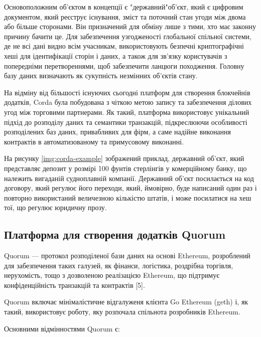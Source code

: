 \documentclass{lib/styles/default-style}
\begin{document}
    Основоположним об'єктом в концепції є "державний"\enspace об'єкт, який є цифровим документом,
    який реєструє існування, зміст та поточний стан угоди між двома або більше сторонами.
    Він призначений для обміну лише з тими, хто має законну причину бачити це.
    Для забезпечення узгодженості глобальної спільної системи, де не всі дані видно всім учасникам,
    використовують безпечні криптографічні хеші для ідентифікації сторін і даних, а також для зв’язку користувачів
    з попередніми перетвореннями,
    щоб забезпечити ланцюги походження. Головну базу даних визначають як сукупність незмінних об'єктів стану.

    На відміну від більшості існуючих сьогодні платформ для створення блокчейнів додатків, Corda була побудована з чіткою метою
    запису та забезпечення ділових угод між торговими партнерами.
    Як такий, платформа використовує унікальний підхід до розподілу даних та семантики транзакцій,
    підкреслюючи особливості розподілених баз даних, привабливих для фірм, а саме надійне виконання контрактів в автоматизованому
    та примусовому виконанні.

    На рисунку \ref{img:corda-example} зображений приклад, державний об'єкт,
    який представляє депозит у розмірі 100 фунтів стерлінгів у комерційному банку,
    що належить вигаданій судноплавній компанії.
    Державний об'єкт посилається на код договору,
    який регулює його переходи, який, ймовірно,
    буде написаний один раз і повторно використаний величезною кількістю штатів, і може посилатися на хеш тої, що регулює юридичну прозу.



\subsection{Платформа для створення додатків Quorum}

    Quorum --- протокол розподіленої бази даних на основі Ethereum, розроблений для забезпечення таких галузей,
    як фінанси, логістика, роздрібна торгівля, нерухомість, тощо з дозволеною реалізацією Ethereum,
    що підтримує конфіденційність транзакцій та контрактів [5].

    Quorum включає мінімалістичне відгалуженя клієнта Go Ethereum (geth) і,
    як такий, використовує роботу, яку розпочала спільнота розробників Ethereum.

    Основними відмінностями Quorum є:
\end{document}

